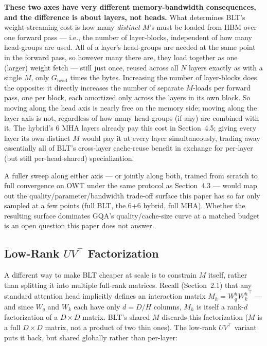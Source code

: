 \documentclass[11pt]{article}
\begin{document}
\textbf{These two axes have very different memory-bandwidth consequences, and the difference is about layers, not heads.} What determines BLT's weight-streaming cost is how many \emph{distinct} $M$'s must be loaded from HBM over one forward pass --- i.e., the number of layer-blocks, independent of how many head-groups are used. All of a layer's head-groups are needed at the same point in the forward pass, so however many there are, they load together as one (larger) weight fetch --- still just once, reused across all $N$ layers exactly as with a single $M$, only $G_{\text{head}}$ times the bytes. Increasing the number of layer-blocks does the opposite: it directly increases the number of separate $M$-loads per forward pass, one per block, each amortized only across the layers in its own block. So moving along the head axis is nearly free on the memory side; moving along the layer axis is not, regardless of how many head-groups (if any) are combined with it. The hybrid's 6 MHA layers already pay this cost in Section~4.5; giving every layer its own distinct $M$ would pay it at every layer simultaneously, trading away essentially all of BLT's cross-layer cache-reuse benefit in exchange for per-layer (but still per-head-shared) specialization.

A fuller sweep along either axis --- or jointly along both, trained from scratch to full convergence on OWT under the same protocol as Section~4.3 --- would map out the quality/parameter/bandwidth trade-off surface this paper has so far only sampled at a few points (full BLT, the 6+6 hybrid, full MHA). Whether the resulting surface dominates GQA's quality/cache-size curve at a matched budget is an open question this paper does not answer.

\subsection{Low-Rank $UV^\top$ Factorization}

A different way to make BLT cheaper at scale is to constrain $M$ itself, rather than splitting it into multiple full-rank matrices. Recall (Section~2.1) that any standard attention head implicitly defines an interaction matrix $M_h = W_q^h {W_k^h}^\top$ --- and since $W_q$ and $W_k$ each have only $d = D/H$ columns, $M_h$ is itself a rank-$d$ factorization of a $D\times D$ matrix. BLT's shared $M$ discards this factorization ($M$ is a full $D\times D$ matrix, not a product of two thin ones). The low-rank $UV^\top$ variant puts it back, but shared globally rather than per-layer:
\end{document}
